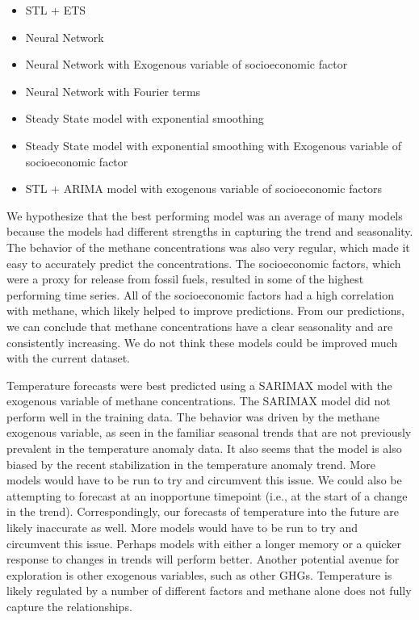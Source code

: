 \documentclass[
]{article}
\providecommand{\tightlist}{%
  \setlength{\itemsep}{0pt}\setlength{\parskip}{0pt}}
\begin{document}
\begin{itemize}
\tightlist
\item
  STL + ETS
\item
  Neural Network
\item
  Neural Network with Exogenous variable of socioeconomic factor
\item
  Neural Network with Fourier terms
\item
  Steady State model with exponential smoothing
\item
  Steady State model with exponential smoothing with Exogenous variable
  of socioeconomic factor
\item
  STL + ARIMA model with exogenous variable of socioeconomic factors
\end{itemize}

We hypothesize that the best performing model was an average of many
models because the models had different strengths in capturing the trend
and seasonality. The behavior of the methane concentrations was also
very regular, which made it easy to accurately predict the
concentrations. The socioeconomic factors, which were a proxy for
release from fossil fuels, resulted in some of the highest performing
time series. All of the socioeconomic factors had a high correlation
with methane, which likely helped to improve predictions. From our
predictions, we can conclude that methane concentrations have a clear
seasonality and are consistently increasing. We do not think these
models could be improved much with the current dataset.

Temperature forecasts were best predicted using a SARIMAX model with the
exogenous variable of methane concentrations. The SARIMAX model did not
perform well in the training data. The behavior was driven by the
methane exogenous variable, as seen in the familiar seasonal trends that
are not previously prevalent in the temperature anomaly data. It also
seems that the model is also biased by the recent stabilization in the
temperature anomaly trend. More models would have to be run to try and
circumvent this issue. We could also be attempting to forecast at an
inopportune timepoint (i.e., at the start of a change in the trend).
Correspondingly, our forecasts of temperature into the future are likely
inaccurate as well. More models would have to be run to try and
circumvent this issue. Perhaps models with either a longer memory or a
quicker response to changes in trends will perform better. Another
potential avenue for exploration is other exogenous variables, such as
other GHGs. Temperature is likely regulated by a number of different
factors and methane alone does not fully capture the relationships.
\end{document}
